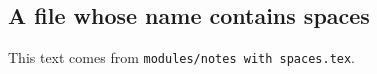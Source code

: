 \subsection{A file whose name contains spaces}
This text comes from \texttt{modules/notes with spaces.tex}.
